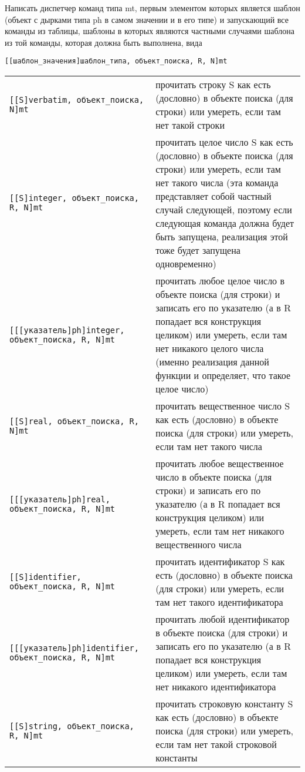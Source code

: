 \documentclass{report}
\begin{document}
    Написать диспетчер команд типа mt, первым элементом которых является шаблон (объект с дырками типа ph в самом значении и в его типе) и запускающий все команды из таблицы, шаблоны в которых являются частными случаями шаблона из той команды, которая должна быть выполнена, вида
    \begin{center}
        \verb|[[шаблон_значения]шаблон_типа, объект_поиска, R, N]mt|
    \end{center}
    \begin{center}
    \begin{tabular}{|l|p{10cm}|}
        \hline
        \verb|[[S]verbatim, объект_поиска, N]mt|&прочитать строку S как есть (дословно) в объекте поиска (для строки) или умереть, если там нет такой строки\\
        \verb|[[S]integer, объект_поиска, R, N]mt|&прочитать целое число S как есть (дословно) в объекте поиска (для строки) или умереть, если там нет такого числа (эта команда представляет собой частный случай следующей, поэтому если следующая команда должна будет быть запущена, реализация этой тоже будет запущена одновременно)\\
        \verb|[[[указатель]ph]integer, объект_поиска, R, N]mt|&прочитать любое целое число в объекте поиска (для строки) и записать его по указателю (а в R попадает вся конструкция целиком) или умереть, если там нет никакого целого числа (именно реализация данной функции и определяет, что такое целое число)\\
        \verb|[[S]real, объект_поиска, R, N]mt|&прочитать вещественное число S как есть (дословно) в объекте поиска (для строки) или умереть, если там нет такого числа\\
        \verb|[[[указатель]ph]real, объект_поиска, R, N]mt|&прочитать любое вещественное число в объекте поиска (для строки) и записать его по указателю (а в R попадает вся конструкция целиком) или умереть, если там нет никакого вещественного числа\\
        \verb|[[S]identifier, объект_поиска, R, N]mt|&прочитать идентификатор S как есть (дословно) в объекте поиска (для строки) или умереть, если там нет такого идентификатора\\
        \verb|[[[указатель]ph]identifier, объект_поиска, R, N]mt|&прочитать любой идентификатор в объекте поиска (для строки) и записать его по указателю (а в R попадает вся конструкция целиком) или умереть, если там нет никакого идентификатора\\
        \verb|[[S]string, объект_поиска, R, N]mt|&прочитать строковую константу S как есть (дословно) в объекте поиска (для строки) или умереть, если там нет такой строковой константы\\

\end{tabular}
\end{center}
\end{document}
